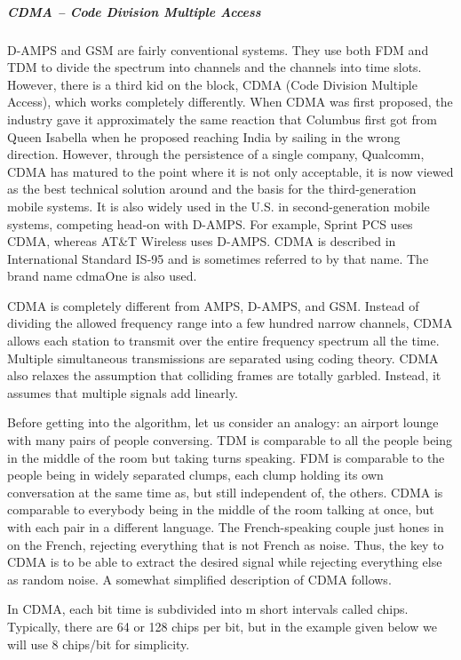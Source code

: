 \protect\hypertarget{0130661023_ch02lev1sec6.htmlux5cux23ch02lev3sec24}{}{}

\subparagraph{CDMA -- Code Division Multiple Access}

D-AMPS and GSM are fairly conventional systems. They use both FDM and
TDM to divide the spectrum into channels and the channels into time
slots. However, there is a third kid on the block, {CDMA} ({Code
Division Multiple Access}), which works completely differently. When
CDMA was first proposed, the industry gave it approximately the same
reaction that Columbus first got from Queen Isabella when he proposed
reaching India by sailing in the wrong direction. However, through the
persistence of a single company, Qualcomm, CDMA has matured to the point
where it is not only acceptable, it is now viewed as the best technical
solution around and the basis for the third-generation mobile systems.
It is also widely used in the U.S. in second-generation mobile systems,
competing head-on with D-AMPS. For example, Sprint PCS uses CDMA,
whereas AT\&T Wireless uses D-AMPS. CDMA is described in International
Standard IS-95 and is sometimes referred to by that name. The brand name
{cdmaOne} is also used.

CDMA is completely different from AMPS, D-AMPS, and GSM. Instead of
dividing the allowed frequency range into a few hundred narrow channels,
CDMA allows each station to transmit over the entire frequency spectrum
all the time. Multiple simultaneous transmissions are separated using
coding theory. CDMA also relaxes the assumption that colliding frames
are totally garbled. Instead, it assumes that multiple signals add
linearly.

Before getting into the algorithm, let us consider an analogy: an
airport lounge with many pairs of people conversing. TDM is comparable
to all the people being in the middle of the room but taking turns
speaking. FDM is comparable to the people being in widely separated
clumps, each clump holding its own conversation at the same time as, but
still independent of, the others. CDMA is comparable to everybody being
in the middle of the room talking at once, but with each pair in a
different language. The French-speaking couple just hones in on the
French, rejecting everything that is not French as noise. Thus, the key
to CDMA is to be able to extract the desired signal while rejecting
everything else as random noise. A somewhat simplified description of
CDMA follows.

In CDMA, each bit time is subdivided into {m} short intervals called
{chips}. Typically, there are 64 or 128 chips per bit, but in the
example given below we will use 8 chips/bit for simplicity.

